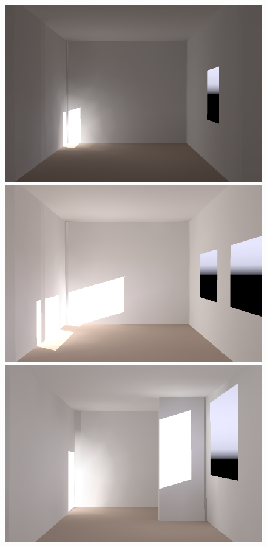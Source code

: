 \begin{figure}[t]
\includegraphics[width=\figwidth]{p3r_065_camera_dark_december_crop.png} %
\includegraphics[width=\figwidth]{p3r_065_camera_dark_december_mod_crop.png} %
\hfill
\includegraphics[width=\figwidth]{p3r_031_camera_dark_december_crop.png} %

\end{figure}
